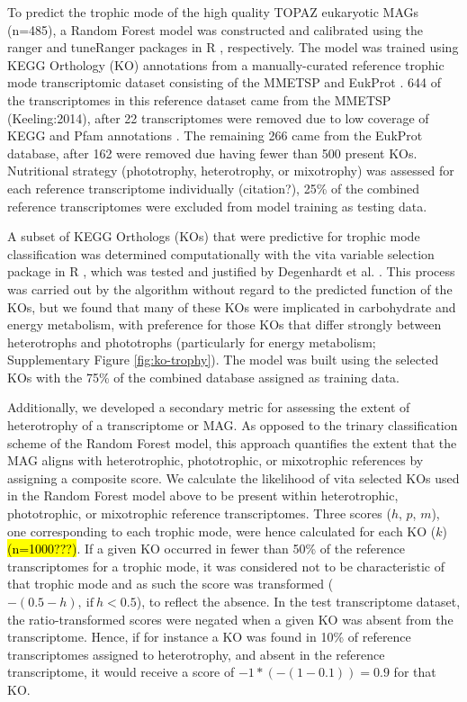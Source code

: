 \documentclass[12pt]{article}
\numberwithin{equation}{section}
\begin{document}
To predict the trophic mode of the high quality TOPAZ eukaryotic MAGs (n=485), a Random Forest model \citep{Breiman_2001} was constructed and calibrated using the ranger \citep{Wright_2017} and tuneRanger packages in R \citep{tuneRanger}, respectively. The model was trained using KEGG Orthology (KO) annotations \citep{Kanehisa_2019} from a manually-curated reference trophic mode transcriptomic dataset consisting of the MMETSP \citep{Keeling2014} and EukProt \citep{Richter2020EukProt}. 644 of the transcriptomes in this reference dataset came from the MMETSP (Keeling:2014), after 22 transcriptomes were removed due to low coverage of KEGG and Pfam annotations \citep{Finn2014Pfam}. The remaining 266 came from the EukProt database, after 162 were removed due having fewer than 500 present KOs. Nutritional strategy (phototrophy, heterotrophy, or mixotrophy) was assessed for each reference transcriptome individually (citation?), 25\% of the combined reference transcriptomes were excluded from model training as testing data. 

A subset of KEGG Orthologs (KOs) that were predictive for trophic mode classification was determined computationally with the vita variable selection package in R \citep{Janitza_2016}, which was tested and justified by Degenhardt et al. \citet{Degenhardt_2017}. This process was carried out by the algorithm without regard to the predicted function of the KOs, but we found that many of these KOs were implicated in carbohydrate and energy metabolism, with preference for those KOs that differ strongly between heterotrophs and phototrophs (particularly for energy metabolism; Supplementary Figure \ref{fig:ko-trophy}). The model was built using the selected KOs with the 75\% of the combined database assigned as training data.

Additionally, we developed a secondary metric for assessing the extent of heterotrophy of a transcriptome or MAG. As opposed to the trinary classification scheme of the Random Forest model, this approach quantifies the extent that the MAG aligns with heterotrophic, phototrophic, or mixotrophic references by assigning a composite score. We calculate the likelihood of vita selected KOs used in the Random Forest model above to be present within heterotrophic, phototrophic, or mixotrophic reference transcriptomes. Three scores ($h$, $p$, $m$), one corresponding to each trophic mode, were hence calculated for each KO ($k$) \hl{(n=1000???)}. If  a given KO occurred in fewer than 50\% of the reference transcriptomes for a trophic mode, it was considered not to be characteristic of that trophic mode and as such the score was transformed ($-(0.5 - h),\ \text{if} \ h<0.5$), to reflect the absence. In the test transcriptome dataset, the ratio-transformed scores were negated when a given KO was absent from the transcriptome. Hence, if for instance a KO was found in 10\% of reference transcriptomes assigned to heterotrophy, and absent in the reference transcriptome, it would receive a score of $-1 * (-(1-0.1)) = 0.9$ for that KO.
\end{document}
